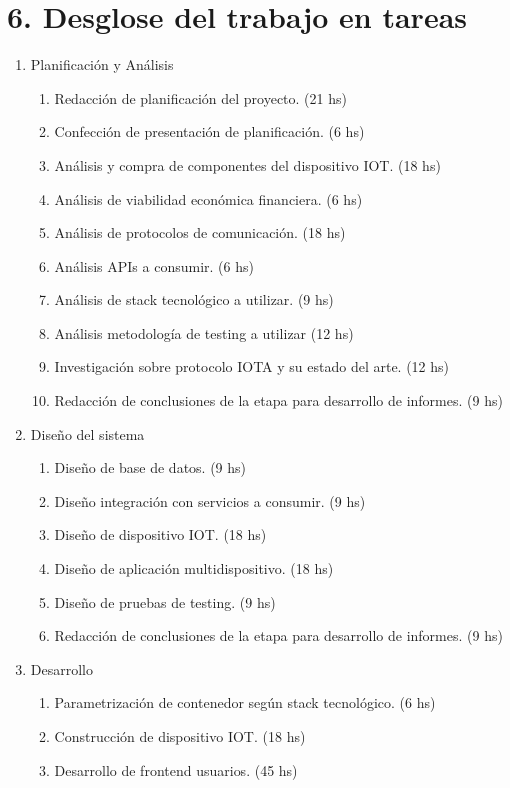 \documentclass[11pt]{charter}
\begin{document}
\section{6. Desglose del trabajo en tareas}
\label{sec:wbs}

\begin{enumerate}
\item Planificación y Análisis
	\begin{enumerate}
	\item Redacción de planificación del proyecto. (21 hs)
	\item Confección de presentación de planificación. (6 hs)
	\item Análisis y compra de componentes del dispositivo IOT. (18 hs)
	\item Análisis de viabilidad económica financiera. (6 hs)
	\item Análisis de protocolos de comunicación. (18 hs)
	\item Análisis APIs a consumir. (6 hs)
	\item Análisis de stack tecnológico a utilizar. (9 hs) 
	\item Análisis metodología de testing a utilizar (12 hs)
	\item Investigación sobre protocolo IOTA y su estado del arte. (12 hs) 
	\item Redacción de conclusiones de la etapa para desarrollo de informes.  (9 hs)
	\end{enumerate}	
\item Diseño del sistema
	\begin{enumerate}
	\item Diseño de base de datos. (9 hs)
	\item Diseño integración con servicios a consumir. (9 hs)
	\item Diseño de dispositivo IOT. (18 hs) 
	\item Diseño de aplicación multidispositivo. (18 hs)
	\item Diseño de pruebas de testing. (9 hs) 
\item Redacción de conclusiones de la etapa para desarrollo de informes.  (9 hs)
	\end{enumerate}
\item Desarrollo
	\begin{enumerate}
	\item Parametrización de contenedor según stack tecnológico. (6 hs)
	\item Construcción de dispositivo IOT. (18 hs) 
	\item Desarrollo de frontend usuarios.  (45 hs)

\end{enumerate}
\end{enumerate}
\end{document}
